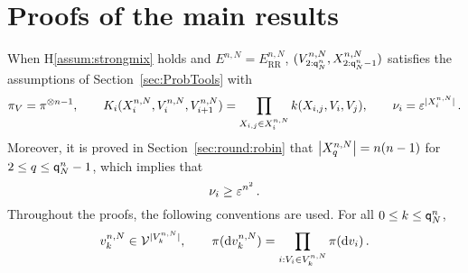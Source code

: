 \section{Proofs of the main results}
\label{sec:MainProofs}
 When H\ref{assum:strongmix} holds and $E^{n,N}=E^{n,N}_{\text{RR}}$, $(V_{2: {\mathsf{q}}^{n}_{N}}^{n,N},X_{2:{\mathsf{q}}^{n}_{N}-1}^{n,N})$ satisfies the assumptions of Section~\ref{sec:ProbTools} with 
 \[
 \pi_V=\pi^{\otimes n-1},\qquad K_i(X_{i}^{n,N},V^{n,N}_i,V^{n,N}_{i+1})=\prod_{X_{i,j}\in X_{i}^{n,N}}k(X_{i,j},V_i,V_j),\qquad \nu_i=\varepsilon^{|X_{i}^{n,N}|}\,.
 \]
 Moreover, it is proved in Section~\ref{sec:round:robin} that $\left|X^{n,N}_{q}\right| = n(n-1)$ for $2 \le q\le {\mathsf{q}}^{n}_{N}-1$, 
 which implies that 
 \[
 \nu_i\ge\varepsilon^{n^2}\,.
 \] 
Throughout the proofs, the following conventions are used. For all $0 \le k \le {\mathsf{q}}^{n}_{N}$,
\[
v^{n,N}_k\in \mathcal{V}^{|V_k^{n,N}|},\qquad \pi(\mathrm{d} v^{n,N}_{k})=\prod_{i : V_i\in V_k^{n,N}}\pi(\mathrm{d} v_i)\,.
\]


